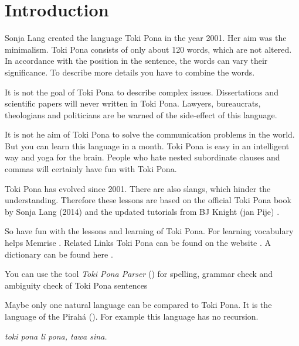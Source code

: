 \section{Introduction}
%
Sonja Lang created the language Toki Pona in the year 2001. 
Her aim was the minimalism. 
Toki Pona consists of only about 120 words, which are not altered. 
In accordance with the position in the sentence, the words can vary their significance. 
To describe more details you have to combine the words.

It is not the goal of Toki Pona to describe complex issues. 
Dissertations and scientific papers will never written in Toki Pona. 
Lawyers, bureaucrats, theologians and politicians are be warned of the side-effect of this language.

It is not he aim of Toki Pona to solve the communication problems in the world. 
But you can learn this language in a month. 
Toki Pona is easy in an intelligent way and yoga for the brain. 
People who hate nested subordinate clauses and commas will certainly have fun with Toki Pona.

Toki Pona has evolved since 2001. 
There are also slangs, which hinder the understanding. 
Therefore these lessons are based on the official Toki Pona book \cite{www:tokipona.org} by Sonja Lang (2014) and the updated tutorials from BJ Knight (jan Pije) \cite{www:Pije:01}.

So have fun with the lessons and learning of Toki Pona. 
For learning vocabulary helps Memrise \cite{www:memrise:01}. Related Links Toki Pona can be found on the website \cite{www:rowa:01}. 
A dictionary can be found here \cite{www:rowa:01}. 

You can use the tool \textit{Toki Pona Parser} (\cite{www:rowa:02}) for spelling, grammar check and ambiguity check of Toki Pona sentences 

Maybe only one natural language can be compared to Toki Pona. 
It is the language of the Pirahá (\cite{www:piraha:01}). 
For example this language has no recursion. 

\textit{toki pona li pona, tawa sina.}
%
